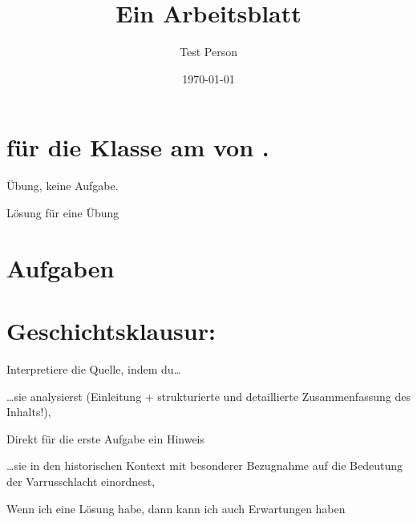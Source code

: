 \documentclass[a4paper,12pt]{scrartcl}
\author{Test Person}
\date{\today}
\title{Ein Arbeitsblatt}
\begin{document}
\maketitle

\listoftodos

\section*{\Titel für die Klasse \Kurs am \Datum von \Autor.}
\blindtext




\begin{exercise}
    Übung, keine Aufgabe.
\end{exercise}
\begin{solution}
    Lösung für eine Übung
\end{solution}

\section*{Aufgaben}


\clearpage
\section*{Geschichtsklausur:}
    Interpretiere die Quelle, indem du\dots
    \begin{aufgabe}[points=10,subtitle=Formale Analyse,symbol=\symBleistift]
        \dots sie analysierst (Einleitung + strukturierte und detaillierte Zusammenfassung des Inhalts!),
        \begin{bearbeitungshinweis}
            Direkt für die erste Aufgabe ein Hinweis
        \end{bearbeitungshinweis}
    \end{aufgabe}
    \bearbeitungshinweisZuAufgabe{}

    \begin{aufgabe}[subtitle=Einordnung in hist. Kontext,symbol=\symSprechblase]
        \dots sie in den historischen Kontext mit besonderer Bezugnahme auf die Bedeutung der Varrusschlacht einordnest,
    \end{aufgabe}
    \begin{loesung}
        Wenn ich eine Lösung habe, dann kann ich auch Erwartungen haben
    \end{loesung}
\end{document}
